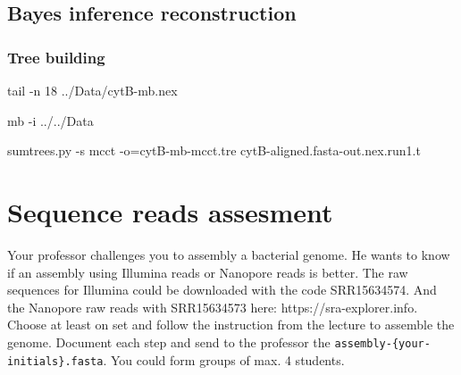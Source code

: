 \documentclass[
  letterpaper,
  DIV=11,
  numbers=noendperiod]{scrreprt}
\newenvironment{Shaded}{\begin{snugshade}}{\end{snugshade}}
\newcommand{\AttributeTok}[1]{\textcolor[rgb]{0.40,0.46,0.14}{#1}}
\newcommand{\ExtensionTok}[1]{\textcolor[rgb]{0.00,0.46,0.62}{#1}}
\newcommand{\FunctionTok}[1]{\textcolor[rgb]{0.28,0.35,0.67}{#1}}
\newcommand{\NormalTok}[1]{\textcolor[rgb]{0.00,0.46,0.62}{#1}}
\newcommand{\OperatorTok}[1]{\textcolor[rgb]{0.37,0.37,0.37}{#1}}
\begin{document}
\hypertarget{bayes-inference-reconstruction}{%
\section*{Bayes inference
reconstruction}\label{bayes-inference-reconstruction}}

\hypertarget{tree-building-1}{%
\subsection*{Tree building}\label{tree-building-1}}

\begin{Shaded}
\begin{Highlighting}[]
\FunctionTok{tail} \AttributeTok{{-}n}\NormalTok{ 18 ../Data/cytB{-}mb.nex}
\end{Highlighting}
\end{Shaded}

\begin{Shaded}
\begin{Highlighting}[]
\ExtensionTok{mb} \AttributeTok{{-}i}\NormalTok{ ../../Data}
\end{Highlighting}
\end{Shaded}

\begin{Shaded}
\begin{Highlighting}[]
\ExtensionTok{sumtrees.py} \AttributeTok{{-}s}\NormalTok{ mcct }\AttributeTok{{-}o}\OperatorTok{=}\NormalTok{cytB{-}mb{-}mcct.tre cytB{-}aligned.fasta{-}out.nex.run1.t}
\end{Highlighting}
\end{Shaded}

\hypertarget{sequence-reads-assesment}{%
\chapter{Sequence reads assesment}\label{sequence-reads-assesment}}

\begin{tcolorbox}[standard jigsaw,toptitle=1mm, colback=white, opacitybacktitle=0.6, title=\textcolor{quarto-callout-warning-color}{\faExclamationTriangle}\hspace{0.5em}{Challenge}, toprule=.15mm, bottomtitle=1mm, colbacktitle=quarto-callout-warning-color!10!white, titlerule=0mm, arc=.35mm, colframe=quarto-callout-warning-color-frame, rightrule=.15mm, opacityback=0, bottomrule=.15mm, leftrule=.75mm, coltitle=black, left=2mm]
Your professor challenges you to assembly a bacterial genome. He wants
to know if an assembly using Illumina reads or Nanopore reads is better.
The raw sequences for Illumina could be downloaded with the code
SRR15634574. And the Nanopore raw reads with SRR15634573 here:
https://sra-explorer.info. Choose at least on set and follow the
instruction from the lecture to assemble the genome. Document each step
and send to the professor the \texttt{assembly-\{your-initials\}.fasta}.
You could form groups of max. 4 students.
\end{tcolorbox}
\end{document}
